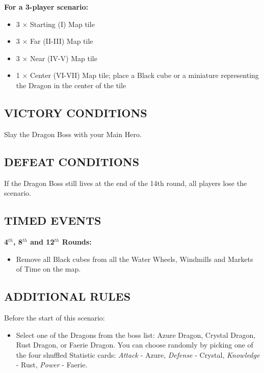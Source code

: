 \begin{multicols*}{2}
\textbf{For a 3-player scenario:}
\begin{itemize}
  \item 3 × Starting (I) Map tile
  \item 3 × Far (II-III) Map tile
  \item 3 × Near (IV-V) Map tile
  \item 1 × Center (VI-VII) Map tile; place a Black cube or a miniature representing the Dragon in the center of the tile
\end{itemize}

\subsection*{\MakeUppercase{Victory Conditions}}
Slay the Dragon Boss with your Main Hero.

\subsection*{\MakeUppercase{Defeat Conditions}}
If the Dragon Boss still lives at the end of the 14th round, all players lose the scenario.

\subsection*{\MakeUppercase{Timed Events}}

\textbf{4$^{th}$, 8$^{th}$ and 12$^{th}$ Rounds:}
\begin{itemize}
  \item Remove all Black cubes from all the Water Wheels, Windmills and Markets of Time on the map.
\end{itemize}

\subsection*{\MakeUppercase{Additional Rules}}

Before the start of this scenario:

\begin{itemize}
  \item Select one of the Dragons from the boss list: Azure Dragon, Crystal Dragon, Rust Dragon, or Faerie Dragon.
    You can choose randomly by picking one of the four shuffled Statistic cards: \textit{Attack} - Azure, \textit{Defense} - Crystal, \textit{Knowledge} - Rust, \textit{Power} - Faerie.
\end{itemize}


\end{multicols*}
